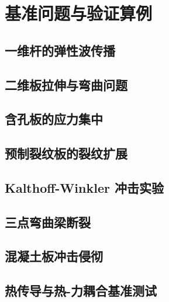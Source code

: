 \chapter{基准问题与验证算例}

\section{一维杆的弹性波传播}

\section{二维板拉伸与弯曲问题}

\section{含孔板的应力集中}

\section{预制裂纹板的裂纹扩展}

\section{Kalthoff-Winkler 冲击实验}

\section{三点弯曲梁断裂}

\section{混凝土板冲击侵彻}

\section{热传导与热-力耦合基准测试}
